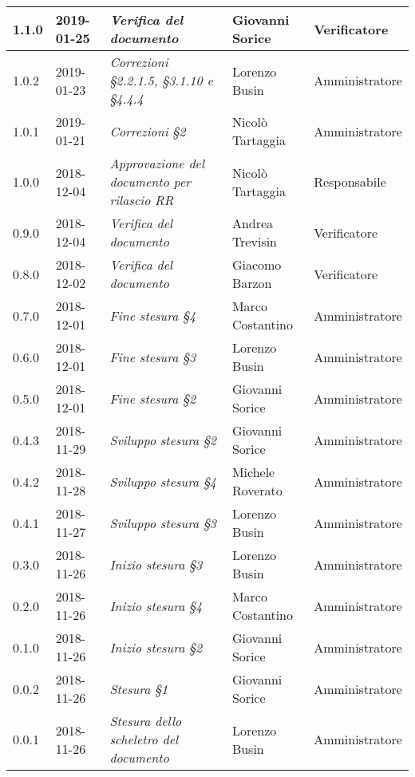 \begin{longtable}{C{2cm}|C{2.5cm}|C{4.5cm}|C{2.5cm}|C{3cm}}
		1.1.0 & 2019-01-25 & \emph{Verifica del documento} & Giovanni Sorice & Verificatore  \\
		\hline
		
		1.0.2 & 2019-01-23 & \emph{Correzioni §2.2.1.5, §3.1.10 e §4.4.4} & Lorenzo Busin & Amministratore \\
		\hline
		
		1.0.1 & 2019-01-21 & \emph{Correzioni §2} & Nicolò Tartaggia & Amministratore  \\
		\hline
		
		1.0.0  & 2018-12-04 & \emph{Approvazione del documento per rilascio RR} & Nicolò Tartaggia & Responsabile \\
		\hline
		
		0.9.0 & 2018-12-04 &\emph{Verifica del documento} & Andrea Trevisin & Verificatore \\
		\hline
		
	    0.8.0 & 2018-12-02 & \emph{Verifica del documento} & Giacomo Barzon & Verificatore  \\
		\hline
		
		0.7.0 & 2018-12-01 & \emph{Fine stesura §4} & Marco Costantino & Amministratore  \\
		\hline
		
		0.6.0 & 2018-12-01 & \emph{Fine stesura §3} & Lorenzo Busin & Amministratore  \\
		\hline
		
	 	0.5.0 & 2018-12-01 & \emph{Fine stesura §2} & Giovanni Sorice & Amministratore  \\
		\hline
		
		0.4.3 & 2018-11-29 & \emph{Sviluppo stesura §2} & Giovanni Sorice & Amministratore  \\
		\hline
		
		0.4.2 & 2018-11-28 & \emph{Sviluppo stesura §4} & Michele Roverato & Amministratore  \\
		\hline
		
		 0.4.1 & 2018-11-27 &\emph{Sviluppo stesura §3} & Lorenzo Busin & Amministratore \\
		\hline
		
		0.3.0 & 2018-11-26 & \emph{Inizio stesura §3} & Lorenzo Busin & Amministratore  \\
		\hline
		
		0.2.0 & 2018-11-26 & \emph{Inizio stesura §4} & Marco Costantino & Amministratore  \\
		\hline
		
		0.1.0 & 2018-11-26 & \emph{Inizio stesura §2} & Giovanni Sorice & Amministratore \\
		\hline
		
		0.0.2 & 2018-11-26 & \emph{Stesura §1} & Giovanni Sorice & Amministratore  \\
		\hline
		
		0.0.1 & 2018-11-26 & \emph{Stesura dello scheletro del documento} & Lorenzo Busin & Amministratore \\
	
	
\end{longtable}


\clearpage